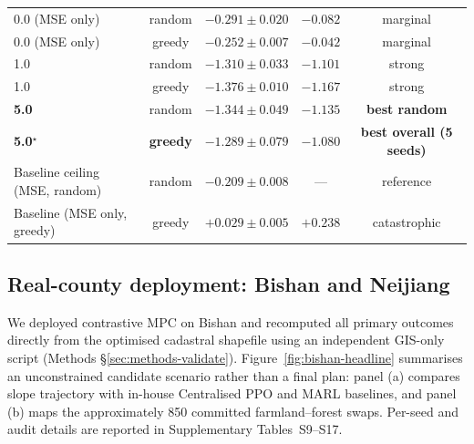 \documentclass[11pt]{article}
\begin{document}
\begin{table}[htbp]
{\begin{tabular}{lccccc}
\midrule
0.0 (MSE only)                  & random & \multicolumn{2}{c}{$-0.291 \pm 0.020$} & $-0.082$ & marginal \\
0.0 (MSE only)                  & greedy & \multicolumn{2}{c}{$-0.252 \pm 0.007$} & $-0.042$ & marginal \\
1.0                             & random & \multicolumn{2}{c}{$-1.310 \pm 0.033$} & $-1.101$ & strong \\
1.0                             & greedy & \multicolumn{2}{c}{$-1.376 \pm 0.010$} & $-1.167$ & strong \\
\textbf{5.0}                    & random & \multicolumn{2}{c}{$\mathbf{-1.344 \pm 0.049}$} & $-1.135$ & \textbf{best random} \\
\textbf{5.0}$^{\star}$          & \textbf{greedy} & \multicolumn{2}{c}{$\mathbf{-1.289 \pm 0.079}$} & $\mathbf{-1.080}$ & \textbf{best overall (5 seeds)} \\
Baseline ceiling (MSE, random)  & random & \multicolumn{2}{c}{$-0.209 \pm 0.008$} & --- & reference \\
Baseline (MSE only, greedy)     & greedy & \multicolumn{2}{c}{$+0.029 \pm 0.005$} & $+0.238$ & catastrophic \\
\bottomrule
\end{tabular}
}
\end{table}

\subsection{Real-county deployment: Bishan and Neijiang}\label{sec:counties}

We deployed contrastive MPC on Bishan and recomputed all primary outcomes directly from the optimised cadastral shapefile using an independent GIS-only script (Methods \S\ref{sec:methods-validate}). Figure~\ref{fig:bishan-headline} summarises an unconstrained candidate scenario rather than a final plan: panel (a) compares slope trajectory with in-house Centralised PPO and MARL baselines, and panel (b) maps the approximately 850 committed farmland--forest swaps. Per-seed and audit details are reported in Supplementary Tables~S9--S17.
\end{document}
